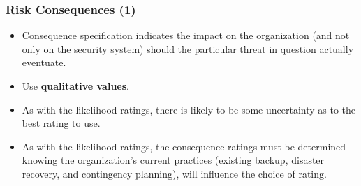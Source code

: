 \documentclass[xcolor ={table,usenames,dvipsnames}]{beamer}
\theoremstyle{definition}
\begin{document}
	\begin{frame}
		\frametitle{Risk Consequences (1)}
		\begin{itemize}
			\item Consequence specification indicates the impact on the organization (and not only on the security system) should the particular threat in question actually eventuate.
			\item Use \textbf{qualitative values}.
			\item As with the likelihood ratings, there is likely to be some uncertainty as to the best rating to use.
			\item As with the likelihood ratings, the consequence ratings must be determined knowing the organization’s current practices (existing backup, disaster recovery, and contingency planning), will influence the choice of rating.
		\end{itemize}
	\end{frame}
	
\end{document}
